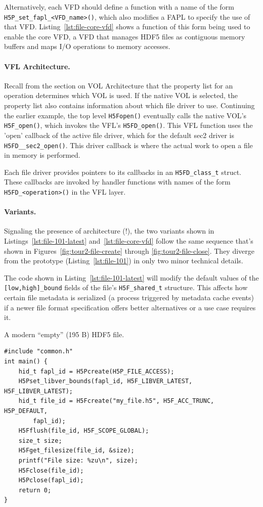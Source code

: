 Alternatively, each VFD should define a function with a name of the form \texttt{H5P\_set\_fapl\_<VFD\_name>()}, which also modifies a FAPL to specify the use of that VFD. Listing~\ref{lst:file-core-vfd} shows a function of this form being used to enable the core VFD, a VFD that manages HDF5 files as contiguous memory buffers and maps I/O operations to memory accesses.

\paragraph{VFL Architecture.} Recall from the section on VOL Architecture that the property list for an operation determines which VOL is used. If the native VOL is selected, the property list also contains information about which file driver to use. Continuing the earlier example, the top level \texttt{H5Fopen()} eventually calls the native VOL's \texttt{H5F\_open()}, which invokes the VFL's \texttt{H5FD\_open()}. This VFL function uses the 'open' callback of the active file driver, which for the default sec2 driver is \texttt{H5FD\_\_sec2\_open()}. This driver callback is where the actual work to open a file in memory is performed. 

Each file driver provides pointers to its callbacks in an \texttt{H5FD\_class\_t} struct. These callbacks are invoked by handler functions with names of the form \texttt{H5FD\_<operation>()} in the VFL layer. %

\paragraph{Variants.} Signaling the presence of architecture (!), the two variants shown in Listings~\ref{lst:file-101-latest} and~\ref{lst:file-core-vfd} follow the same sequence that's shown in Figures~\ref{fig:tour2-file-create} through \ref{fig:tour2-file-close}. They diverge from the prototype (Listing~\ref{lst:file-101}) in only two minor technical details.

The code shown in Listing~\ref{lst:file-101-latest} will modify the default values of the \texttt{[low,high]\_bound} fields of the file's \texttt{H5F\_shared\_t} structure. This affects how certain file metadata is serialized (a process triggered by metadata cache events) if a newer file format specification offers better alternatives or a use case requires it.

\begin{listing}
\centering
\caption{A modern ``empty'' (195 B) HDF5 file.}
\label{lst:file-101-latest}
\begin{verbatim}
#include "common.h"
int main() {
    hid_t fapl_id = H5Pcreate(H5P_FILE_ACCESS);
    H5Pset_libver_bounds(fapl_id, H5F_LIBVER_LATEST, H5F_LIBVER_LATEST);
    hid_t file_id = H5Fcreate("my_file.h5", H5F_ACC_TRUNC, H5P_DEFAULT,
        fapl_id);
    H5Fflush(file_id, H5F_SCOPE_GLOBAL);
    size_t size;
    H5Fget_filesize(file_id, &size);
    printf("File size: %zu\n", size);
    H5Fclose(file_id);
    H5Pclose(fapl_id);
    return 0;
}
\end{verbatim}
\end{listing}

